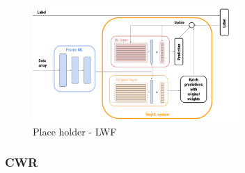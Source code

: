 \documentclass[12pt]{report}
\begin{document}
%
\begin{figure}[h!]
    \centering
    \includegraphics[width=0.7\textwidth]{Figures/Chapter3/LWF.png} 
    \caption{Place holder - LWF}
    \label{fig:block_diag_LWF}    
\end{figure}
%
\subsubsection{CWR}
\end{document}
